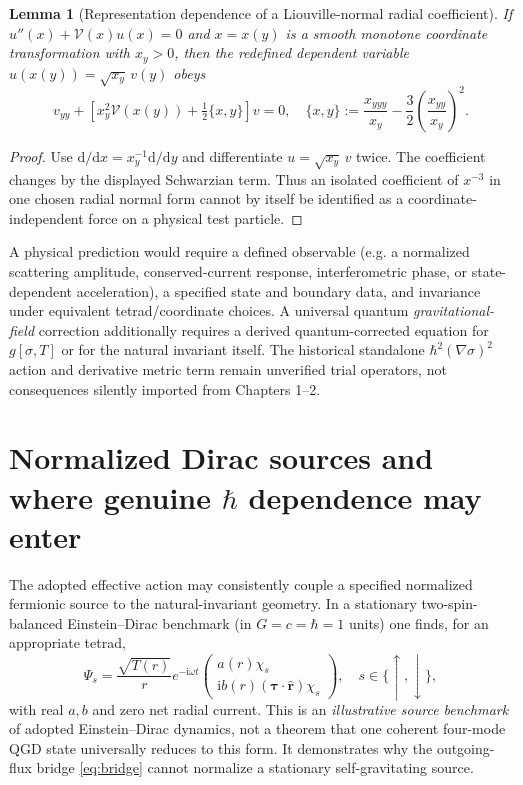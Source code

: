 \documentclass[11pt,a4paper,oneside]{report}
\numberwithin{equation}{chapter}
\newtheorem{lemma}[theorem]{Lemma}
\theoremstyle{definition}\newtheorem{definition}[theorem]{Definition}
\theoremstyle{remark}\newtheorem{remark}[theorem]{Remark}
\newcommand{\dd}{\mathrm d}
\newcommand{\ii}{\mathrm i}
\begin{document}
\begin{lemma}[Representation dependence of a Liouville-normal radial coefficient]\label{lem:schwarzian}
If $u''(x)+\mathcal V(x)u(x)=0$ and $x=x(y)$ is a smooth monotone coordinate transformation with $x_y>0$, then the redefined dependent variable $u(x(y))=\sqrt{x_y}\,v(y)$ obeys
\begin{equation}
 v_{yy}+\left[x_y^2\mathcal V(x(y))+\tfrac12\{x,y\}\right]v=0,
 \quad\{x,y\}:=\frac{x_{yyy}}{x_y}-\frac32\left(\frac{x_{yy}}{x_y}\right)^2.
 \label{eq:Schwarzian}
\end{equation}
\end{lemma}
\begin{proof}
Use $\dd/\dd x=x_y^{-1}\dd/\dd y$ and differentiate $u=\sqrt{x_y}\,v$ twice. The coefficient changes by the displayed Schwarzian term. Thus an isolated coefficient of $x^{-3}$ in one chosen radial normal form cannot by itself be identified as a coordinate-independent force on a physical test particle.
\end{proof}

A physical prediction would require a defined observable (e.g. a normalized scattering amplitude, conserved-current response, interferometric phase, or state-dependent acceleration), a specified state and boundary data, and invariance under equivalent tetrad/coordinate choices. A universal quantum \emph{gravitational-field} correction additionally requires a derived quantum-corrected equation for $g[\sigma,T]$ or for the natural invariant itself. The historical standalone $\hbar^2(\nabla\sigma)^2$ action and derivative metric term remain unverified trial operators, not consequences silently imported from Chapters 1--2.

\section{Normalized Dirac sources and where genuine $\hbar$ dependence may enter}\label{sec:source}
The adopted effective action may consistently couple a specified normalized fermionic source to the natural-invariant geometry. In a stationary two-spin-balanced Einstein--Dirac benchmark (in $G=c=\hbar=1$ units) one finds, for an appropriate tetrad,
\begin{equation}
 \Psi_s=\frac{\sqrt{T(r)}}r e^{-\ii\omega t}
 \begin{pmatrix}a(r)\chi_s\\ \ii b(r)(\bm\tau\cdot\widehat{\bm r})\chi_s\end{pmatrix},
 \quad s\in\{\uparrow,\downarrow\},
 \label{eq:sourcewave}
\end{equation}
with real $a,b$ and zero net radial current. This is an \emph{illustrative source benchmark} of adopted Einstein--Dirac dynamics, not a theorem that one coherent four-mode QGD state universally reduces to this form. It demonstrates why the outgoing-flux bridge \eqref{eq:bridge} cannot normalize a stationary self-gravitating source.
\end{document}
